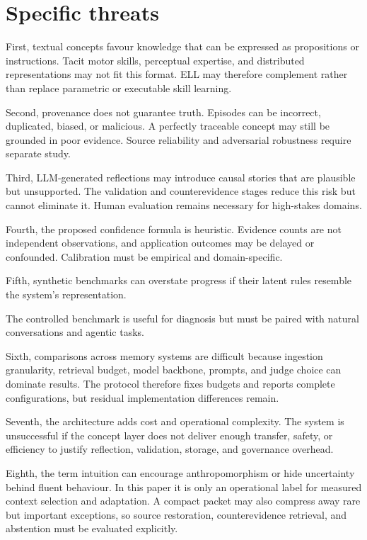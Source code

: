 \documentclass[
  english,
  a4paper,
  DIV=11,
  numbers=noendperiod]{scrreprt}
\begin{document}
\section{Specific threats}\label{specific-threats}

First, textual concepts favour knowledge that can be expressed as
propositions or instructions. Tacit motor skills, perceptual expertise,
and distributed representations may not fit this format. ELL may
therefore complement rather than replace parametric or executable skill
learning.

Second, provenance does not guarantee truth. Episodes can be incorrect,
duplicated, biased, or malicious. A perfectly traceable concept may
still be grounded in poor evidence. Source reliability and adversarial
robustness require separate study.

Third, LLM-generated reflections may introduce causal stories that are
plausible but unsupported. The validation and counterevidence stages
reduce this risk but cannot eliminate it. Human evaluation remains
necessary for high-stakes domains.

Fourth, the proposed confidence formula is heuristic. Evidence counts
are not independent observations, and application outcomes may be
delayed or confounded. Calibration must be empirical and
domain-specific.

Fifth, synthetic benchmarks can overstate progress if their latent rules
resemble the system's representation.

The controlled benchmark is useful for diagnosis but must be paired with
natural conversations and agentic tasks.

Sixth, comparisons across memory systems are difficult because ingestion
granularity, retrieval budget, model backbone, prompts, and judge choice
can dominate results. The protocol therefore fixes budgets and reports
complete configurations, but residual implementation differences remain.

Seventh, the architecture adds cost and operational complexity. The
system is unsuccessful if the concept layer does not deliver enough
transfer, safety, or efficiency to justify reflection, validation,
storage, and governance overhead.

Eighth, the term intuition can encourage anthropomorphism or hide
uncertainty behind fluent behaviour. In this paper it is only an
operational label for measured context selection and adaptation. A
compact packet may also compress away rare but important exceptions, so
source restoration, counterevidence retrieval, and abstention must be
evaluated explicitly.
\end{document}
